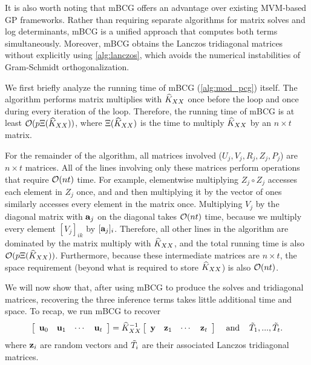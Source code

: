 It is also worth noting that mBCG offers an advantage over existing MVM-based GP frameworks.
Rather than requiring separate algorithms for matrix solves and log determinants, mBCG is a unified approach that computes both terms simultaneously.
Moreover, mBCG obtains the Lanczos tridiagonal matrices without explicitly using \cref{alg:lanczos}, which avoids the numerical instabilities of Gram-Schmidt orthogonalization.

We first briefly analyze the running time of mBCG (\cref{alg:mod_pcg}) itself.
The algorithm performs matrix multiplies with $\widehat{K}_{XX}$ once before the loop and once during every iteration of the loop.
Therefore, the running time of mBCG is at least $\bigo{p\mmm{\trainK}}$, where $\Xi (\widehat{K}_{XX})$ is the time to multiply $\widehat{K}_{XX}$ by an $n \times t$ matrix.

For the remainder of the algorithm, all matrices involved ($U_{j},V_j,R_j,Z_j,P_j$) are $n \times t$ matrices.
All of the lines involving only these matrices perform operations that require $\bigo{nt}$ time.
For example, elementwise multiplying $Z_{j} \circ Z_{j}$ accesses each element in $Z_{j}$ once, and and then multiplying it by the vector of ones similarly accesses every element in the matrix once.
Multiplying $V_{j}$ by the diagonal matrix with $\mathbf{a}_{j}$ on the diagonal takes $\bigo{nt}$ time, because we multiply every element $[V_{j}]_{ik}$ by $[\mathbf{a}_{j}]_{i}$.
Therefore, all other lines in the algorithm are dominated by the matrix multiply with $\widehat{K}_{XX}$, and the total running time is also $\bigo{p\mmm{\trainK}}$.
Furthermore, because these intermediate matrices are $n \times t$, the space requirement (beyond what is required to store $\widehat{K}_{XX}$) is also $\bigo{nt}$.

We will now show that, after using mBCG to produce the solves and tridiagonal matrices, recovering the three inference terms takes little additional time and space.
To recap, we run mBCG to recover
%
\begin{equation*}
  \left[\begin{array}{cccc}\mathbf{u}_{0} & \mathbf{u}_{1} & \cdots & \mathbf{u}_{t}\end{array}\right] = \widehat{K}_{XX}^{-1}\left[\begin{array}{cccc}\mathbf{y} & \mathbf{z}_{1} & \cdots & \mathbf{z}_{t}\end{array}\right] \:\:\:\:\: \text{and} \:\:\:\:\: \tilde{T}_{1},...,\tilde{T}_{t}.
\end{equation*}
%
where $\mathbf{z}_i$ are random vectors and $\tilde {T}_i$ are their associated Lanczos tridiagonal matrices.


